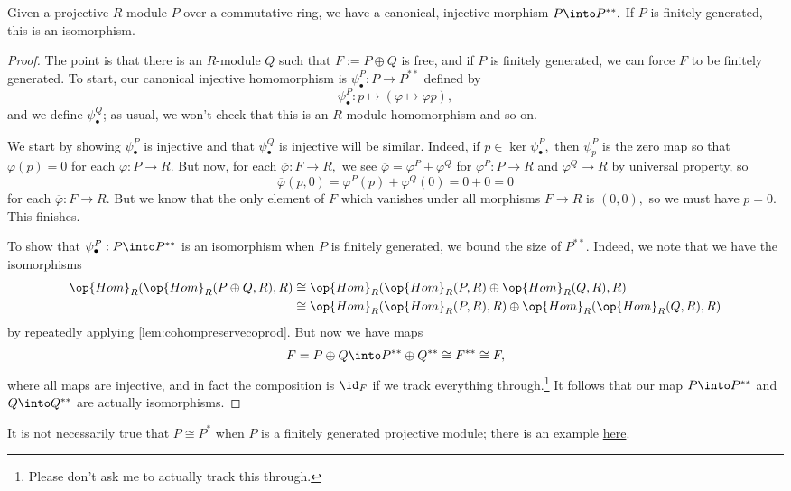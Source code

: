 \begin{proposition}
	Given a projective $R$-module $P$ over a commutative ring, we have a canonical, injective morphism $P\into P^{**}.$ If $P$ is finitely generated, this is an isomorphism.
\end{proposition}
\begin{proof}
	The point is that there is an $R$-module $Q$ such that $F:=P\oplus Q$ is free, and if $P$ is finitely generated, we can force $F$ to be finitely generated. To start, our canonical injective homomorphism is $\psi^P_\bullet:P\to P^{**}$ defined by
	\[\psi^P_\bullet:p\mapsto(\varphi\mapsto\varphi p),\]
	and we define $\psi^Q_\bullet$; as usual, we won't check that this is an $R$-module homomorphism and so on.
	
	We start by showing $\psi^P_\bullet$ is injective and that $\psi^Q_\bullet$ is injective will be similar. Indeed, if $p\in\ker\psi^P_\bullet,$ then $\psi^P_p$ is the zero map so that $\varphi(p)=0$ for each $\varphi:P\to R.$ But now, for each $\overline{\varphi}:F\to R,$ we see $\overline\varphi=\varphi^P+\varphi^Q$ for $\varphi^P:P\to R$ and $\varphi^Q\to R$ by universal property, so
	\[\overline\varphi(p,0)=\varphi^P(p)+\varphi^Q(0)=0+0=0\]
	for each $\overline\varphi:F\to R.$ But we know that the only element of $F$ which vanishes under all morphisms $F\to R$ is $(0,0),$ so we must have $p=0.$ This finishes.
	
	To show that $\psi^P_\bullet:P\into P^{**}$ is an isomorphism when $P$ is finitely generated, we bound the size of $P^{**}.$ Indeed, we note that we have the isomorphisms
	\begin{align*}
		\op{Hom}_R(\op{Hom}_R(P\oplus Q,R),R) &\cong \op{Hom}_R(\op{Hom}_R(P,R)\oplus\op{Hom}_R(Q,R),R) \\
		&\cong\op{Hom}_R(\op{Hom}_R(P,R),R)\oplus\op{Hom}_R(\op{Hom}_R(Q,R),R)
	\end{align*}
	by repeatedly applying \autoref{lem:cohompreservecoprod}. But now we have maps
	\[F=P\oplus Q\into P^{**}\oplus Q^{**}\cong F^{**}\cong F,\]
	where all maps are injective, and in fact the composition is $\id_F$ if we track everything through.\footnote{Please don't ask me to actually track this through.} It follows that our map $P\into P^{**}$ and $Q\into Q^{**}$ are actually isomorphisms.
\end{proof}
\begin{remark}
	It is not necessarily true that $P\cong P^*$ when $P$ is a finitely generated projective module; there is an example \href{https://math.stackexchange.com/a/1343962/869257}{here}.
\end{remark}
